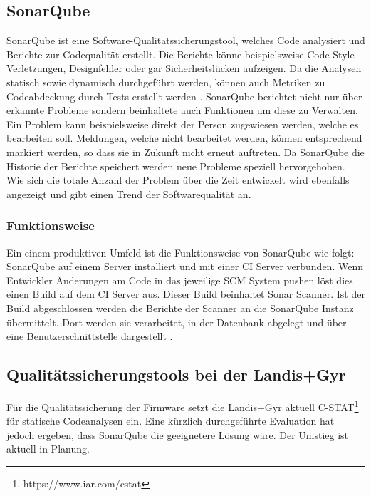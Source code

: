 \subsection{SonarQube}\label{quality:sonar}
SonarQube ist eine Software-Qualitatssicherungstool, welches Code analysiert und Berichte zur Codequalität erstellt.
Die Berichte könne beispielsweise Code-Style-Verletzungen, Designfehler oder gar Sicherheitslücken aufzeigen.
Da die Analysen statisch sowie dynamisch durchgeführt werden, können auch Metriken zu Codeabdeckung durch Tests erstellt werden \parencite{malloy_2021}.
SonarQube berichtet nicht nur über erkannte Probleme sondern beinhaltete auch Funktionen um diese zu Verwalten.
Ein Problem kann beispielsweise direkt der Person zugewiesen werden, welche es bearbeiten soll.
Meldungen, welche nicht bearbeitet werden, können entsprechend markiert werden, so dass sie in Zukunft nicht erneut auftreten.
Da SonarQube die Historie der Berichte speichert werden neue Probleme speziell hervorgehoben.
Wie sich die totale Anzahl der Problem über die Zeit entwickelt wird ebenfalls angezeigt und gibt einen Trend der Softwarequalität an.


\subsubsection{Funktionsweise}
Ein einem produktiven Umfeld ist die Funktionsweise von SonarQube wie folgt:
SonarQube auf einem Server installiert und mit einer \ac{CI} Server verbunden.
Wenn Entwickler Änderungen am Code in das jeweilige \ac{SCM} System pushen löst dies einen Build auf dem \ac{CI} Server aus.
Dieser Build beinhaltet Sonar Scanner.
Ist der Build abgeschlossen werden die Berichte der Scanner an die SonarQube Instanz übermittelt.
Dort werden sie verarbeitet, in der Datenbank abgelegt und über eine Benutzerschnittstelle dargestellt \parencite{malloy_2021}.

\subsection{Qualitätssicherungstools bei der Landis+Gyr}
Für die Qualitätssicherung der Firmware setzt die Landis+Gyr aktuell C-STAT\footnote{https://www.iar.com/cstat} für statische Codeanalysen ein.
Eine kürzlich durchgeführte Evaluation hat jedoch ergeben, dass SonarQube die geeignetere Lösung wäre.
Der Umstieg ist aktuell in Planung.

